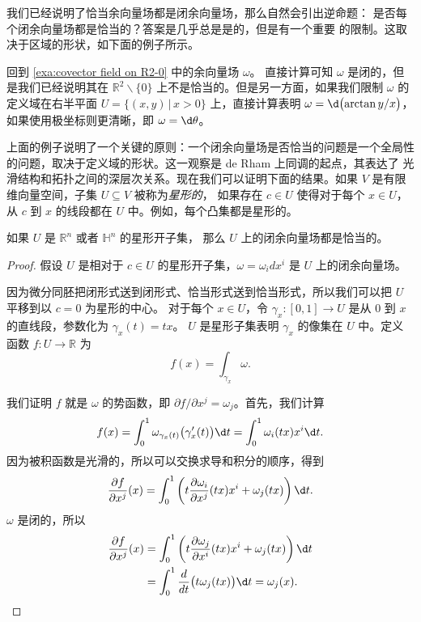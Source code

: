 我们已经说明了恰当余向量场都是闭余向量场，那么自然会引出逆命题：
是否每个闭余向量场都是恰当的？答案是几乎总是是的，但是有一个重要
的限制。这取决于区域的形状，如下面的例子所示。

\begin{example}
  回到 \autoref{exa:covector field on R2-0} 中的余向量场 $\omega$。
  直接计算可知 $\omega$ 是闭的，但是我们已经说明其在 $\mathbb{R}^2 \smallsetminus\{0\}$
  上不是恰当的。但是另一方面，如果我们限制 $\omega$ 的定义域在右半平面
  $U=\{(x,y)\,|\, x>0\}$ 上，直接计算表明 $\omega=\d\bigl(\arctan y/x\bigr)$，
  如果使用极坐标则更清晰，即 $\omega=\d\theta$。
\end{example}

上面的例子说明了一个关键的原则：一个闭余向量场是否恰当的问题是一个全局性
的问题，取决于定义域的形状。这一观察是 de Rham 上同调的起点，其表达了
光滑结构和拓扑之间的深层次关系。现在我们可以证明下面的结果。如果
$V$ 是有限维向量空间，子集 $U\subseteq V$ 被称为\emph{星形的}，
如果存在 $c\in U$ 使得对于每个 $x\in U$，从 $c$ 到 $x$ 的线段都在
$U$ 中。例如，每个凸集都是星形的。

\begin{theorem}
  如果 $U$ 是 $\mathbb{R}^n$ 或者 $\mathbb{H}^n$ 的星形开子集，
  那么 $U$ 上的闭余向量场都是恰当的。
\end{theorem}
\begin{proof}
  假设 $U$ 是相对于 $c\in U$ 的星形开子集，$\omega=\omega_idx^i$ 是 $U$ 上的闭余向量场。

  因为微分同胚把闭形式送到闭形式、恰当形式送到恰当形式，所以我们可以把 $U$ 平移到以 $c=0$ 为星形的中心。
  对于每个 $x\in U$，令 $\gamma_x:[0,1]\to U$ 是从 $0$ 到 $x$ 的直线段，参数化为 $\gamma_x(t)=tx$。
  $U$ 是星形子集表明 $\gamma_x$ 的像集在 $U$ 中。定义函数 $f:U\to \mathbb R$ 为
  \[
    f(x)=\int_{\gamma_x}\omega.
  \]

  我们证明 $f$ 就是 $\omega$ 的势函数，即 $\partial f/\partial x^j=\omega_j$。首先，我们计算
  \[
    f(x)=\int_0^1\omega_{\gamma_x(t)}\bigl(\gamma_x'(t)\bigr) \d t
    =\int_0^1 \omega_i(tx) x^i \d t .
  \]
  因为被积函数是光滑的，所以可以交换求导和积分的顺序，得到
  \[
    \frac{\partial f}{\partial x^j}(x)=\int_0^1\left(
      t\frac{\partial \omega_i}{\partial x^j}(tx)x^i+\omega_j(tx)
    \right)\d t.
  \]
  $\omega$ 是闭的，所以 
  \begin{align*}
    \frac{\partial f}{\partial x^j}(x)&=\int_0^1\left(
      t\frac{\partial \omega_j}{\partial x^i}(tx)x^i+\omega_j(tx)
    \right)\d t\\
    &=\int_0^1\frac{d}{dt}\bigl(t\omega_j(tx)\bigr) \d t=\omega_j(x).\qedhere
  \end{align*}
\end{proof}






